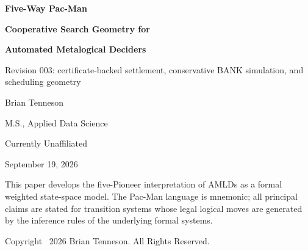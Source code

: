 \documentclass[11pt]{article}
\theoremstyle{remark}
\begin{document}
\hypersetup{pageanchor=false}

\begin{titlepage}
\thispagestyle{empty}
\centering
\vspace*{0.65in}
{\Huge\bfseries Five-Way Pac-Man\par}
\vspace{0.16in}
{\LARGE\bfseries Cooperative Search Geometry for\par}
\vspace{0.08in}
{\LARGE\bfseries Automated Metalogical Deciders\par}
\vspace{0.12in}
{\large Revision 003: certificate-backed settlement, conservative BANK simulation, and scheduling geometry\par}
\vspace{0.52in}
{\Large Brian Tenneson\par}
\vspace{0.08in}
{\large M.S., Applied Data Science\par}
{\large Currently Unaffiliated\par}
\vfill
{\large September 19, 2026\par}
\vspace{0.25in}
{\small This paper develops the five-Pioneer interpretation of AMLDs as a formal weighted state-space model. The Pac-Man language is mnemonic; all principal claims are stated for transition systems whose legal logical moves are generated by the inference rules of the underlying formal systems.\par}
\vspace{0.3in}
{\small Copyright \textcopyright\ 2026 Brian Tenneson. All Rights Reserved.\par}
\end{titlepage}
\hypersetup{pageanchor=true}
\end{document}
